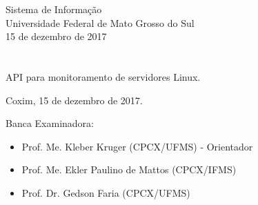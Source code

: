 \vskip 0.5cm
\begin{center}
Sistema de Informação\\
Universidade Federal de Mato Grosso do Sul\\
15 de dezembro de 2017
\end{center}
		

\chapter*{}

\begin{center}

\begin{minipage}[t]{10cm}
	\begin{center}
		\vspace{-2cm}
		{{\Large API para monitoramento de servidores Linux.}} 
	\end{center}
\end{minipage}

\end{center}


\begin{flushright}
	\vspace{12cm}
	Coxim, 15 de dezembro de 2017.
	
\end{flushright}

\vspace{2cm}
Banca Examinadora:

\begin{itemize}
	\item Prof. Me. Kleber Kruger (CPCX/UFMS) - Orientador
	\item Prof. Me. Ekler Paulino de Mattos (CPCX/IFMS)
	\item Prof. Dr. Gedson Faria (CPCX/UFMS)

\end{itemize}
